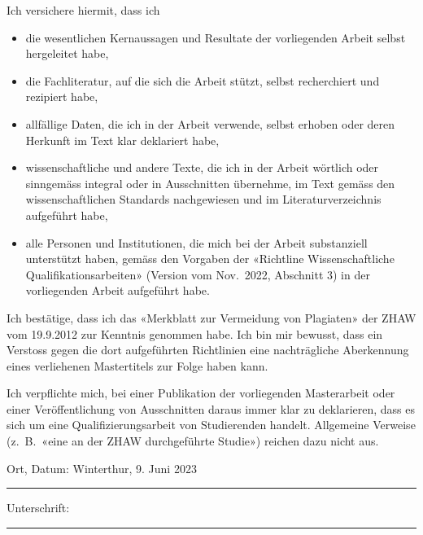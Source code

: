 

\begin{declaration}

\noindent Ich versichere hiermit, dass ich

\begin{itemize} 
\item die wesentlichen Kernaussagen und Resultate der vorliegenden Arbeit selbst hergeleitet habe,
\item die Fachliteratur, auf die sich die Arbeit stützt, selbst recherchiert und rezipiert habe,
\item allfällige Daten, die ich in der Arbeit verwende, selbst erhoben oder deren Herkunft im Text klar deklariert habe,
\item wissenschaftliche und andere Texte, die ich in der Arbeit wörtlich oder sinngemäss integral oder in Ausschnitten übernehme, im Text gemäss den wissenschaftlichen Standards nachgewiesen und im Literaturverzeichnis aufgeführt habe,
\item alle Personen und Institutionen, die mich bei der Arbeit substanziell unterstützt haben, gemäss den Vorgaben der «Richtline Wissenschaftliche Qualifikationsarbeiten» (Version vom Nov.~2022, Abschnitt 3) in der vorliegenden Arbeit aufgeführt habe.
\end{itemize}

Ich bestätige, dass ich das «Merkblatt zur Vermeidung von Plagiaten» der ZHAW vom 19.9.2012 zur Kenntnis genommen habe. Ich bin mir bewusst, dass ein Verstoss gegen die dort aufgeführten Richtlinien eine nachträgliche Aberkennung eines verliehenen Mastertitels zur Folge haben kann.

Ich verpflichte mich, bei einer Publikation der vorliegenden Masterarbeit oder einer Veröffentlichung von Ausschnitten daraus immer klar zu deklarieren, dass es sich um eine Qualifizierungsarbeit von Studierenden handelt. Allgemeine Verweise (z.~B.~«eine an der ZHAW durchgeführte Studie») reichen dazu nicht aus. 

\vspace{1cm}

\noindent Ort, Datum: Winterthur, 9. Juni 2023\\
\rule[0.5em]{25em}{0.5pt} %
 
\noindent Unterschrift:\\
\rule[0.5em]{25em}{0.5pt} %
\end{declaration}
